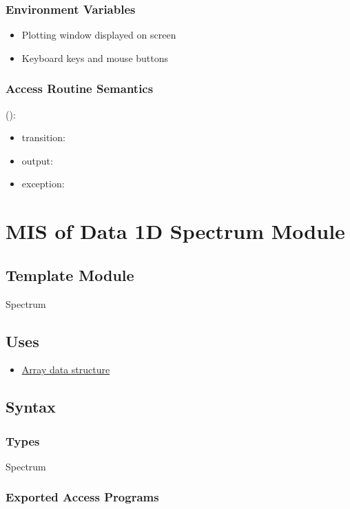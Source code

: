 \documentclass[12pt, titlepage]{article}
\begin{document}
\subsubsection{Environment Variables}
\begin{itemize}
\item Plotting window displayed on screen
\item Keyboard keys and mouse buttons
\end{itemize}


\subsubsection{Access Routine Semantics}

\noindent {}():
\begin{itemize}
\item transition:  
\item output:  
\item exception:  
\end{itemize}

\section{MIS of Data 1D Spectrum Module} \label{Mod:Spectrum}
\subsection{Template Module}
Spectrum

\subsection{Uses}
\begin{itemize}
\item \hyperref[Mod:Array]{Array data structure}
\end{itemize}

\subsection{Syntax}

\subsubsection{Types}
Spectrum

\subsubsection{Exported Access Programs}
\end{document}
